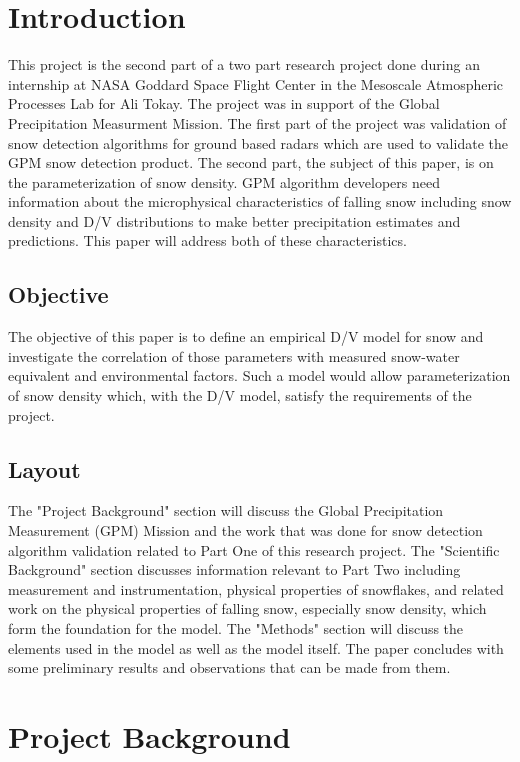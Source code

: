 \documentclass[10pt,a4paper]{article}
\begin{document}
\section{Introduction}
This project is the second part of a two part research project done during an internship at NASA Goddard Space Flight Center in the Mesoscale Atmospheric Processes Lab for Ali Tokay. The project was in support of the Global Precipitation Measurment Mission. The first part of the project was validation of snow detection algorithms for ground based radars which are used to validate the GPM snow detection product. The second part, the subject of this paper, is on the parameterization of snow density. GPM algorithm developers need information about the microphysical characteristics of falling snow including snow density and D/V distributions to make better precipitation estimates and predictions. This paper will address both of these characteristics.

\subsection{Objective}
The objective of this paper is to define an empirical D/V model for snow and investigate the correlation of those parameters with measured snow-water equivalent and environmental factors. Such a model would allow parameterization of snow density which, with the D/V model, satisfy the requirements of the project.

\subsection{Layout}
The "Project Background" section will discuss the Global Precipitation Measurement (GPM) Mission and the work that was done for snow detection algorithm validation related to Part One of this research project. The "Scientific Background" section discusses information relevant to Part Two including measurement and instrumentation, physical properties of snowflakes, and related work on the physical properties of falling snow, especially snow density, which form the foundation for the model. The "Methods" section will discuss the elements used in the model as well as the model itself. The paper concludes with some preliminary results and observations that can be made from them.

\section{Project Background}
\end{document}
